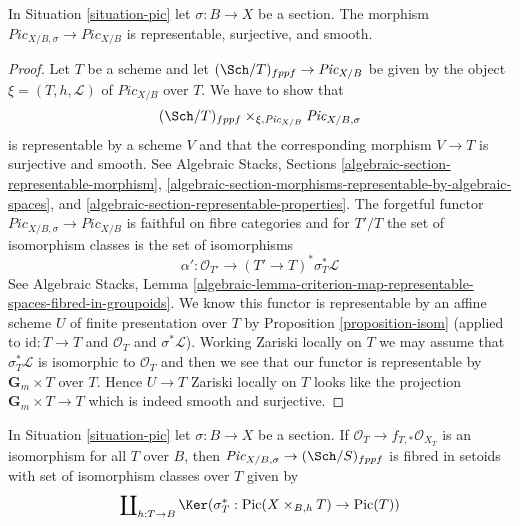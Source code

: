 \begin{lemma}
\label{lemma-compare-pic-with-section}
In Situation \ref{situation-pic} let $\sigma : B \to X$ be a section.
The morphism $\textit{Pic}_{X/B, \sigma} \to \textit{Pic}_{X/B}$
is representable, surjective, and smooth.
\end{lemma}

\begin{proof}
Let $T$ be a scheme and let $(\Sch/T)_{fppf} \to \textit{Pic}_{X/B}$
be given by the object $\xi = (T, h, \mathcal{L})$ of $\textit{Pic}_{X/B}$
over $T$. We have to show that
$$
(\Sch/T)_{fppf} \times_{\xi, \textit{Pic}_{X/B}} \textit{Pic}_{X/B, \sigma}
$$
is representable by a scheme $V$ and that the corresponding morphism
$V \to T$ is surjective and smooth. See
Algebraic Stacks, Sections \ref{algebraic-section-representable-morphism},
\ref{algebraic-section-morphisms-representable-by-algebraic-spaces}, and
\ref{algebraic-section-representable-properties}.
The forgetful functor $\textit{Pic}_{X/B, \sigma} \to \textit{Pic}_{X/B}$
is faithful on fibre categories and for $T'/T$ the set of isomorphism
classes is the set of isomorphisms
$$
\alpha' : \mathcal{O}_{T'} \longrightarrow (T' \to T)^*\sigma_T^*\mathcal{L}
$$
See Algebraic Stacks, Lemma
\ref{algebraic-lemma-criterion-map-representable-spaces-fibred-in-groupoids}.
We know this functor is representable by an affine scheme $U$ of finite
presentation over $T$ by Proposition \ref{proposition-isom}
(applied to $\text{id} : T \to T$ and $\mathcal{O}_T$ and
$\sigma^*\mathcal{L}$). Working Zariski locally on $T$ we may
assume that $\sigma_T^*\mathcal{L}$ is isomorphic to $\mathcal{O}_T$
and then we see that our functor is representable by
$\mathbf{G}_m \times T$ over $T$. Hence
$U \to T$ Zariski locally on $T$ looks like 
the projection $\mathbf{G}_m \times T \to T$ which
is indeed smooth and surjective.
\end{proof}

\begin{lemma}
\label{lemma-flat-geometrically-connected-fibres-with-section-functor-stack}
In Situation \ref{situation-pic} let $\sigma : B \to X$ be a section.
If $\mathcal{O}_T \to f_{T, *}\mathcal{O}_{X_T}$ is an isomorphism
for all $T$ over $B$, then
$\textit{Pic}_{X/B, \sigma} \to (\Sch/S)_{fppf}$
is fibred in setoids with set of isomorphism classes over $T$ given by
$$
\coprod\nolimits_{h : T \to B}
\Ker(\sigma_T^* : \text{Pic}(X \times_{B, h} T) \to \text{Pic}(T))
$$
\end{lemma}

